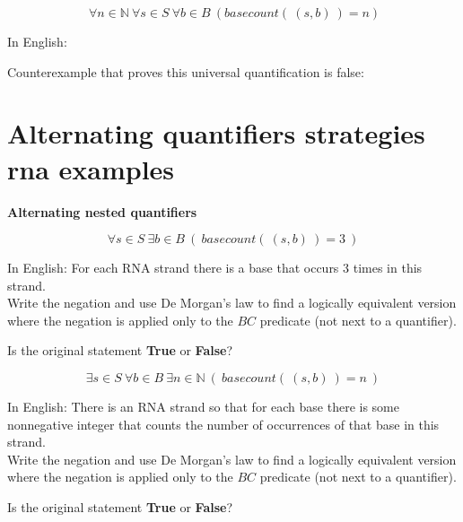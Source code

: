 \documentclass[12pt, oneside]{article}
\newcommand{\A}[0]{\texttt{A}}
\newcommand{\G}[0]{\texttt{G}}
\newcommand{\U}[0]{\texttt{U}}
\begin{document}
\vfill

\[
    ~\forall n \in \mathbb{N} ~\forall s \in S ~\forall b \in B  ~(basecount(~(s,b)~) = n)
\]

In English: \phantom{There exists an ordered $3$-tuple 
at which the predicate $BC$ evaluates to $T$.}

\vspace{30pt}

Counterexample that proves this universal quantification is false:
\phantom{$(\G\G, \G, 3)$ or $(\G\A\U\G, \G, 2)$)}

\vspace{30pt}



\vfill \vfill
\section*{Alternating quantifiers strategies rna examples}


{\bf Alternating nested quantifiers}

$$\forall s \in S ~\exists b\in B ~(~basecount(~(s,b)~) = 3~)$$

In English: For each RNA strand there is a base that occurs 3 times in this strand.\\

Write the negation and use De Morgan's law to find a 
logically equivalent version where the negation is applied only to the 
$BC$ predicate (not next to a quantifier).

\vspace{60pt}


Is the original statement {\bf True} or {\bf False}?



\vfill



$$\exists s \in S ~\forall b \in B ~\exists n \in \mathbb{N} ~(~basecount(~(s,b)~) = n~)$$

In English: There is an RNA strand so that for each base there is some nonnegative
integer that counts the number of occurrences of that base in this strand.\\

Write the negation and use De Morgan's law to find a 
logically equivalent version where the negation is applied only to the 
$BC$ predicate (not next to a quantifier).

\vspace{60pt}


Is the original statement {\bf True} or {\bf False}?
\end{document}
